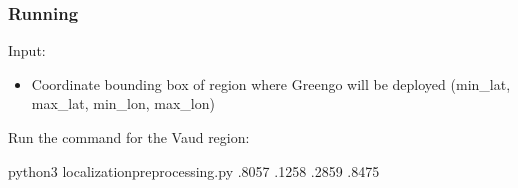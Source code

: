 \documentclass[letterpaper,10pt,english]{sphinxmanual}
\begin{document}
\subsubsection{Running}
\label{\detokenize{microservices/map_preprocessing/introduction:running}}
Input:
\begin{itemize}
\item {} 
Coordinate bounding box of region where Greengo will be deployed (min\_lat, max\_lat, min\_lon, max\_lon)

\end{itemize}

 Run the command for the Vaud region:

\begin{sphinxVerbatim}[commandchars=\\\{\}]
python3 localization\PYGZus{}preprocessing.py .8057 .1258 .2859 .8475
\end{sphinxVerbatim}
\end{document}
